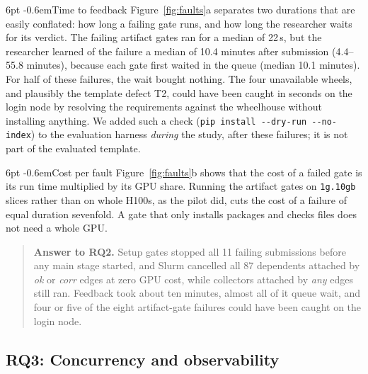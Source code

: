 \documentclass[pdflatex,sn-mathphys-num]{sn-jnl}
\makeatletter
\theoremstyle{thmstyletwo}%
\theoremstyle{thmstylethree}%
\newcommand{\code}[1]{\texttt{#1}}
\newcommand{\RQ}[1]{\textbf{RQ#1}}
\renewcommand\paragraph{\@startsection{paragraph}{4}{\z@}%
  {6pt \@plus 2pt \@minus 1pt}{-0.6em}{\normalfont\normalsize\bfseries}}
\makeatother
\begin{document}
\paragraph{Time to feedback} Figure~\ref{fig:faults}a separates two durations that are easily conflated: how long a failing gate runs, and how long the researcher waits for its verdict. The failing artifact gates ran for a median of 22\,s, but the researcher learned of the failure a median of 10.4 minutes after submission (4.4--55.8 minutes), because each gate first waited in the queue (median 10.1 minutes). For half of these failures, the wait bought nothing. The four unavailable wheels, and plausibly the template defect T2, could have been caught in seconds on the login node by resolving the requirements against the wheelhouse without installing anything. We added such a check (\code{pip install -{}-dry-run -{}-no-index}) to the evaluation harness \emph{during} the study, after these failures; it is not part of the evaluated template.

\paragraph{Cost per fault} Figure~\ref{fig:faults}b shows that the cost of a failed gate is its run time multiplied by its GPU share. Running the artifact gates on \code{1g.10gb} slices rather than on whole H100s, as the pilot did, cuts the cost of a failure of equal duration sevenfold. A gate that only installs packages and checks files does not need a whole GPU.

\begin{quote}\small\textbf{Answer to \RQ{2}.} Setup gates stopped all 11 failing submissions before any main stage started, and Slurm cancelled all 87 dependents attached by \emph{ok} or \emph{corr} edges at zero GPU cost, while collectors attached by \emph{any} edges still ran. Feedback took about ten minutes, almost all of it queue wait, and four or five of the eight artifact-gate failures could have been caught on the login node.\end{quote}

\subsection{RQ3: Concurrency and observability}\label{sec:rq3}
\end{document}
